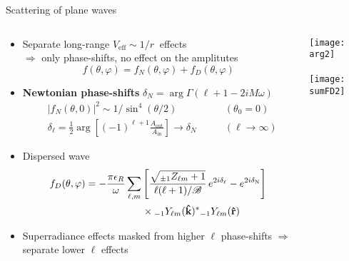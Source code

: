 \documentclass[9pt]{beamer}
\newcommand{\xDownarrow}[1]{%
	{\left\Downarrow\vbox to #1{}\right.\kern-\nulldelimiterspace}
}
\newcommand{\uu}[3][]{ {}_{#1} #2_{#3} }
\begin{document}
\begin{frame}{Scattering of plane waves}
	\begin{columns}[T]      
		\begin{column}{0.73\textwidth}
			\begin{itemize}
				\setlength\itemsep{1.2em}
				\item Separate long-range $V_\mathrm{eff} \sim 1/r~$ effects\\ $\Rightarrow$ only phase-shifts, no effect on the amplitutes
				$$ f(\theta,\varphi) = f_N(\theta,\varphi) + f_D(\theta,\varphi) $$

				\item \textbf{Newtonian phase-shifts} $\delta_N = \arg\Gamma(\ell+1-2 i M \omega)$
				\begin{alignat*}{3}
					&|f_N(\theta,0)|^2 \sim 1/\sin^4(\theta/2) & (\theta_0=0) \\
					&\delta_\ell = \tfrac{1}{2}\arg\left[(-1)^{\ell+1}\frac{A_\mathrm{out}}{A_\mathrm{in}}\right] \longrightarrow \delta_N \qquad&(\ell\to\infty)
				\end{alignat*}

				\item Dispersed wave
				\begin{align*}
					f_D(\theta,\varphi) &= - \frac{\pi \epsilon_R}{\omega} \sum_{\ell,m} \left[ \frac{\sqrt{ \uu[\pm 1]{Z}{\ell m} +1 }}{\ell(\ell+1)/\mathscr{B}} \, e^{2 i \delta_\ell } - e^{2 i \delta_\mathrm{N} } \right] \\
					& \hspace*{2cm}\times \uu[-1]{Y}{\ell m}(\mathbf{\hat{k}})^{*} \uu[-1]{Y}{\ell m}(\mathbf{\hat{r}})
				\end{align*}
				
				\item Superradiance effects masked from higher $\ell$ phase-shifts $\Rightarrow$ separate lower $\ell$ effects
			\end{itemize}
		\end{column}
		\begin{column}{0.4\textwidth}
			\texttt{[image: arg2]} \\[0.1cm]
			$\hspace{2.2cm}\xDownarrow{0.3cm}$ \\[0.1cm]
			\texttt{[image: sumFD2]}
		\end{column}
	\end{columns}
\end{frame}
\end{document}
